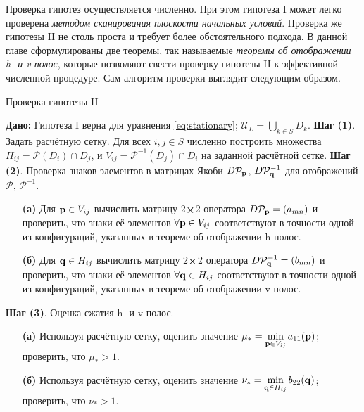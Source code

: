 \documentclass[candidate, href, colorlinks]{disser}
\begin{document}
Проверка гипотез осуществляется численно.
При этом гипотеза I может легко проверена {\it методом сканирования плоскости начальных условий}.
Проверка же гипотезы II не столь проста и требует более обстоятельного подхода.
В данной главе сформулированы две теоремы, так называемые {\it теоремы об отображении h- и v-полос}, которые позволяют свести проверку гипотезы II к эффективной численной процедуре.
Сам алгоритм проверки выглядит следующим образом.

\begin{algorithm}[H]
\caption{Проверка гипотезы II}
\label{algorithm:hypotheses-validation}
\begin{algorithmic}
	\STATE \textbf{Дано:} Гипотеза I верна для уравнения \eqref{eq:stationary}; $\mathscr{U}_L = \bigcup_{k \in S} D_k$.
	\STATE \textbf{Шаг (1)}. Задать расчётную сетку.
		Для всех $i, j \in S$ численно построить множества $H_{ij} = \mathcal{P}(D_i) \cap D_j$, и $V_{ij} = \mathcal{P}^{-1} (D_j) \cap D_i$ на заданной расчётной сетке.
	\STATE \textbf{Шаг (2)}. Проверка знаков элементов в матрицах Якоби $D \mathcal{P}_{\vb{p}}$, $D \mathcal{P}_{\vb{q}}^{-1}$ для отображений $\mathcal{P}$, $\mathcal{P}^{-1}$.
	\STATE
	\begin{enumerate}
		\setlength{\itemsep}{1pt}
		\setlength{\parskip}{0pt}
  		\setlength{\parsep}{0pt}
		\item[\textbf{(а)}] Для $\vb{p} \in V_{ij}$ вычислить матрицу 2$\cross$2 оператора $D \mathcal{P}_{\vb{p}} = (a_{mn})$ и проверить, что знаки её элементов $\forall \vb{p} \in V_{ij}$ соответствуют в точности одной из конфигураций, указанных в теореме об отображении h-полос.
		\item[\textbf{(б)}] Для $\vb{q} \in H_{ij}$ вычислить матрицу 2$\cross$2 оператора $D \mathcal{P}_{\vb{q}}^{-1} = (b_{mn})$ и проверить, что знаки её элементов $\forall \vb{q} \in H_{ij}$ соответствуют в точности одной из конфигураций, указанных в теореме об отображении v-полос.
	\end{enumerate}
	\STATE \textbf{Шаг (3)}. Оценка сжатия h- и v-полос.
	\STATE
	\begin{enumerate}
		\setlength{\itemsep}{1pt}
		\setlength{\parskip}{0pt}
  		\setlength{\parsep}{0pt}
		\item[\textbf{(а)}] Используя расчётную сетку, оценить значение $\mu_* = \min \limits_{\vb{p} \in V_{ij}} a_{11}(\vb{p})$; проверить, что $\mu_* > 1$.
		\item[\textbf{(б)}] Используя расчётную сетку, оценить значение $\nu_* = \min \limits_{\vb{q} \in H_{ij}} b_{22}(\vb{q})$; проверить, что $\nu_* > 1$.
	\end{enumerate}
\end{algorithmic}
\end{algorithm}
\end{document}
